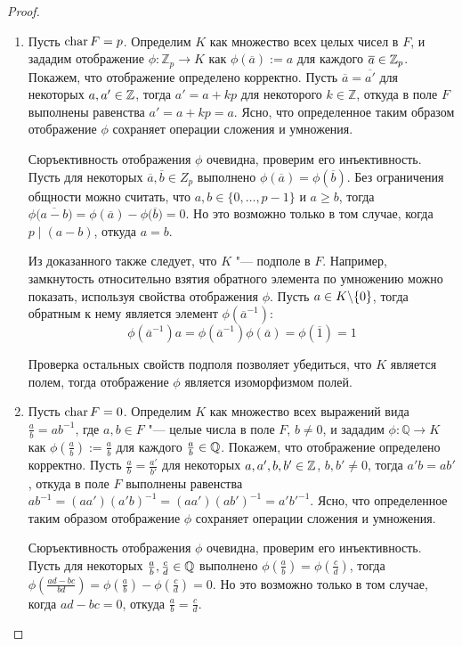 \begin{proof}~
	\begin{enumerate}
		\item Пусть $\operatorname{char}{F} = p$. Определим $K$ как множество всех целых чисел в $F$, и зададим отображение $\phi: \mathbb{Z}_p \rightarrow K$ как $\phi(\overline{a}) := a$ для каждого $\overline{a} \in \mathbb{Z}_p$. Покажем, что отображение определено корректно. Пусть $\overline{a} = \overline{a'}$ для некоторых $a, a' \in \mathbb{Z}$, тогда $a' = a + kp$ для некоторого $k \in \mathbb{Z}$, откуда в поле $F$ выполнены равенства $a' = a + kp = a$. Ясно, что определенное таким образом отображение $\phi$ сохраняет операции сложения и умножения.
		
		Сюръективность отображения $\phi$ очевидна, проверим его инъективность. Пусть для некоторых $\overline{a}, \overline{b} \in Z_p$ выполнено $\phi(\overline{a}) = \phi(\overline{b})$. Без ограничения общности можно считать, что $a, b \in \{0,\dots, p-1\}$ и $a \ge b$, тогда $\phi\big(\overline{a - b}\big) = \phi(\overline{a}) - \phi\big(\overline{b}\big) = 0$. Но это возможно только в том случае, когда $p \mid (a - b)$, откуда $a = b$.
		
		Из доказанного также следует, что $K$ "--- подполе в $F$. Например, замкнутость относительно взятия обратного элемента по умножению можно показать, используя свойства отображения $\phi$. Пусть $a \in K \backslash \{0\}$, тогда обратным к нему является элемент $\phi(\overline{a}^{-1})$:
		\[\phi(\overline{a}^{-1}) a = \phi(\overline{a}^{-1})\phi(\overline{a}) = \phi(\overline{1}) = 1\]
		
		Проверка остальных свойств подполя позволяет убедиться, что $K$ является полем, тогда отображение $\phi$ является изоморфизмом полей.
	
		\item Пусть $\operatorname{char}{F} = 0$. Определим $K$ как множество всех выражений вида $\frac ab = ab^{-1}$, где $a, b \in F$ "--- целые числа в поле $F$, $b \ne 0$, и зададим $\phi: \mathbb{Q} \rightarrow K$ как $\phi(\frac{a}{b}) := \frac ab$ для каждого $\frac ab \in \mathbb{Q}$. Покажем, что отображение определено корректно. Пусть $\frac{a}{b} = \frac{a'}{b'}$ для некоторых $a, a', b, b' \in \mathbb{Z}$, $b, b' \ne 0$, тогда $a'b = ab'$, откуда в поле $F$ выполнены равенства $ab^{-1} = (aa')(a'b)^{-1} = (aa')(ab')^{-1} = a'b'^{-1}$. Ясно, что определенное таким образом отображение $\phi$ сохраняет операции сложения и умножения.
		
		Сюръективность отображения $\phi$ очевидна, проверим его инъективность. Пусть для некоторых $\frac ab, \frac cd \in \mathbb{Q}$ выполнено $\phi(\frac ab) = \phi(\frac cd)$, тогда $\phi(\frac{ad - bc}{bd}) = \phi(\frac ab) - \phi(\frac cd) = 0$. Но это возможно только в том случае, когда ${ad - bc} = 0$, откуда $\frac ab = \frac cd$.
		

\end{enumerate}
\end{proof}
